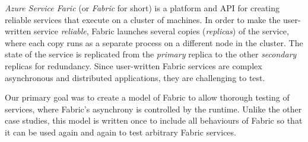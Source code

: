 \emph{Azure Service Faric} (or \emph{Fabric} for short) is a platform and API for creating reliable services that execute on a cluster of machines. 
In order to make the user-written service \emph{reliable}, Fabric launches several copies (\emph{replicas}) of the service, where each copy runs as a separate process on a different node in the cluster.
The state of the service is replicated from the \emph{primary} replica to the other \emph{secondary} replicas for redundancy.
Since user-written Fabric services are complex asynchronous and distributed applications, 
they are challenging to test.

Our primary goal was to create a \psharp{} model of Fabric to allow
thorough testing of services, where Fabric's asynchrony is controlled 
by the \psharp{} runtime.
Unlike the other case studies,
this model is written once
to include all behaviours of Fabric
so that it can be used again and again to test arbitrary Fabric services.


